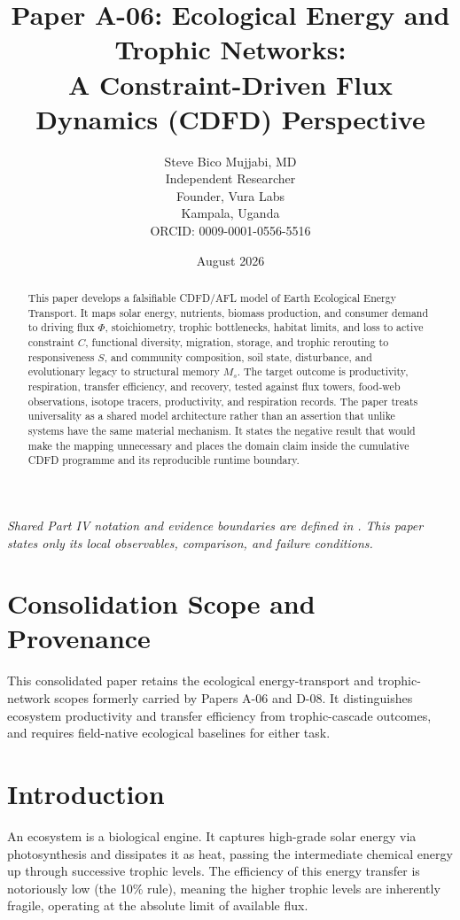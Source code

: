 \documentclass[11pt,a4paper]{article}
\title{\textbf{Paper A-06: Ecological Energy and Trophic Networks:\\ A Constraint-Driven Flux Dynamics (CDFD) Perspective}}
\author{Steve Bico Mujjabi, MD\\
\small Independent Researcher\\
\small Founder, Vura Labs\\
\small Kampala, Uganda\\
\small ORCID: 0009-0001-0556-5516}
\date{August 2026}
\begin{document}
\maketitle

\noindent\textit{Shared Part IV notation and evidence boundaries are defined in . This paper states only its local observables, comparison, and failure conditions.}


\begin{abstract}
This paper develops a falsifiable CDFD/AFL model of Earth Ecological Energy Transport. It maps solar energy, nutrients, biomass production, and consumer demand to driving flux $\Phi$, stoichiometry, trophic bottlenecks, habitat limits, and loss to active constraint $C$, functional diversity, migration, storage, and trophic rerouting to responsiveness $S$, and community composition, soil state, disturbance, and evolutionary legacy to structural memory $M_s$. The target outcome is productivity, respiration, transfer efficiency, and recovery, tested against flux towers, food-web observations, isotope tracers, productivity, and respiration records. The paper treats universality as a shared model architecture rather than an assertion that unlike systems have the same material mechanism. It states the negative result that would make the mapping unnecessary and places the domain claim inside the cumulative CDFD programme and its reproducible runtime boundary.
\end{abstract}
\section*{Consolidation Scope and Provenance}
This consolidated paper retains the ecological energy-transport and trophic-network scopes formerly carried by Papers A-06 and D-08. It distinguishes ecosystem productivity and transfer efficiency from trophic-cascade outcomes, and requires field-native ecological baselines for either task.


\section{Introduction}

An ecosystem is a biological engine. It captures high-grade solar energy via photosynthesis and dissipates it as heat, passing the intermediate chemical energy up through successive trophic levels. The efficiency of this energy transfer is notoriously low (the 10\% rule), meaning the higher trophic levels are inherently fragile, operating at the absolute limit of available flux.
\end{document}
